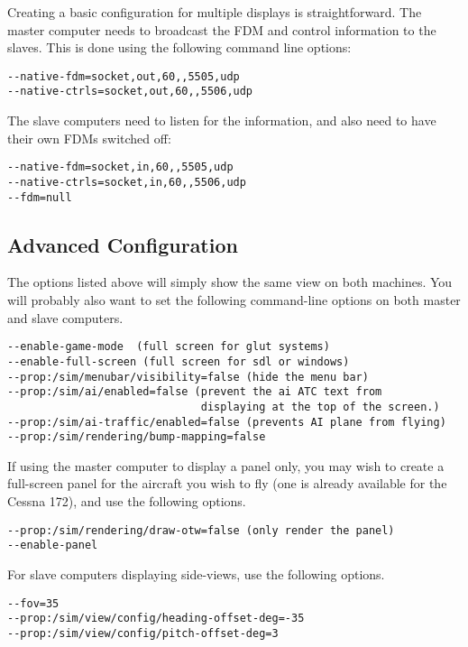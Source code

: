 Creating a basic configuration for multiple displays is straightforward. The
master computer needs to broadcast the FDM and control information to the slaves.
This is done using the following command line options:

\begin{verbatim}
--native-fdm=socket,out,60,,5505,udp
--native-ctrls=socket,out,60,,5506,udp
\end{verbatim}

The slave computers need to listen for the information, and also need to have
their own FDMs switched off:

\begin{verbatim}
--native-fdm=socket,in,60,,5505,udp
--native-ctrls=socket,in,60,,5506,udp
--fdm=null
\end{verbatim}

\subsection{Advanced Configuration}

The options listed above will simply show the same view on both machines. You will probably also want to set the
following command-line options on both master and slave computers.

\begin{verbatim}
--enable-game-mode  (full screen for glut systems)
--enable-full-screen (full screen for sdl or windows)
--prop:/sim/menubar/visibility=false (hide the menu bar)
--prop:/sim/ai/enabled=false (prevent the ai ATC text from 
                              displaying at the top of the screen.)
--prop:/sim/ai-traffic/enabled=false (prevents AI plane from flying)
--prop:/sim/rendering/bump-mapping=false
\end{verbatim}

If using the master computer to display a panel only, you may wish to create a full-screen panel for the
aircraft you wish to fly (one is already available for the Cessna 172), and use the following options.

\begin{verbatim}
--prop:/sim/rendering/draw-otw=false (only render the panel)
--enable-panel
\end{verbatim}

For slave computers displaying side-views, use the following options.

\begin{verbatim}
--fov=35
--prop:/sim/view/config/heading-offset-deg=-35
--prop:/sim/view/config/pitch-offset-deg=3
\end{verbatim}

